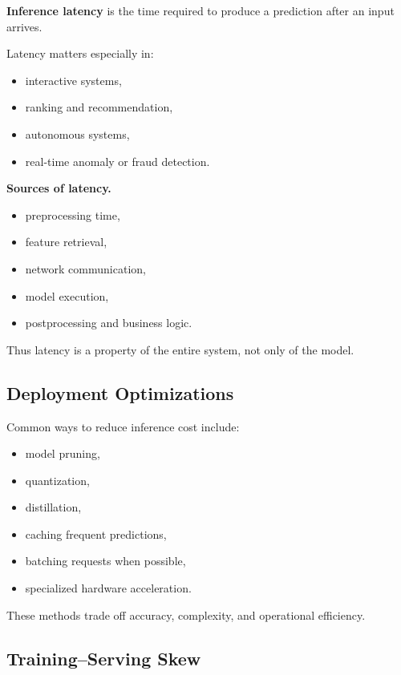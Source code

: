 \textbf{Inference latency} is the time required to produce a prediction after an input arrives.

\medskip

\noindent
Latency matters especially in:
\begin{itemize}
    \item interactive systems,
    \item ranking and recommendation,
    \item autonomous systems,
    \item real-time anomaly or fraud detection.
\end{itemize}

\medskip

\noindent
\textbf{Sources of latency.}
\begin{itemize}
    \item preprocessing time,
    \item feature retrieval,
    \item network communication,
    \item model execution,
    \item postprocessing and business logic.
\end{itemize}

\medskip

\noindent
Thus latency is a property of the entire system, not only of the model.

\subsection{Deployment Optimizations}

Common ways to reduce inference cost include:
\begin{itemize}
    \item model pruning,
    \item quantization,
    \item distillation,
    \item caching frequent predictions,
    \item batching requests when possible,
    \item specialized hardware acceleration.
\end{itemize}

\medskip

\noindent
These methods trade off accuracy, complexity, and operational efficiency.

\subsection{Training--Serving Skew}

